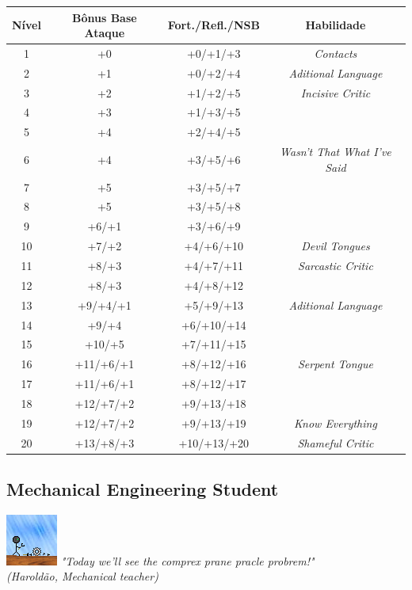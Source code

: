 \documentclass[ letterpaper,12pt]{article}
\begin{document}
\begin{center} \begin{tabular}{|c||c|c|c|}
\hline
{\bf Nível}&{\bf Bônus Base Ataque}&{\bf Fort./Refl./NSB}&{\bf Habilidade}\\
\hline
1&+0&+0/+1/+3&{\it Contacts}\\
\hline
2&+1&+0/+2/+4&{\it Aditional Language}\\
\hline
3&+2&+1/+2/+5&{\it Incisive Critic}\\
\hline
4&+3&+1/+3/+5&\\
\hline
5&+4&+2/+4/+5&\\
\hline
6&+4&+3/+5/+6&{\it Wasn't That What I've Said}\\
\hline
7&+5&+3/+5/+7&\\
\hline
8&+5&+3/+5/+8&\\
\hline
9&+6/+1&+3/+6/+9&\\
\hline
10&+7/+2&+4/+6/+10&{\it Devil Tongues}\\
\hline
11&+8/+3&+4/+7/+11&{\it Sarcastic Critic}\\
\hline
12&+8/+3&+4/+8/+12&\\
\hline
13&+9/+4/+1&+5/+9/+13&{\it Aditional Language}\\
\hline
14&+9/+4&+6/+10/+14&\\
\hline
15&+10/+5&+7/+11/+15&\\
\hline
16&+11/+6/+1&+8/+12/+16&{\it Serpent Tongue}\\
\hline
17&+11/+6/+1&+8/+12/+17&\\
\hline
18&+12/+7/+2&+9/+13/+18&\\
\hline
19&+12/+7/+2&+9/+13/+19&{\it Know Everything}\\
\hline
20&+13/+8/+3&+10/+13/+20&{\it Shameful Critic}\\
\hline
\end{tabular} \end{center}

\subsection{Mechanical Engineering Student}
\includegraphics{../data/classes/Img/engmecanica.png}
{\it "Today we'll see the comprex prane pracle probrem!"\\ (Haroldão, Mechanical teacher)}\\
\end{document}
